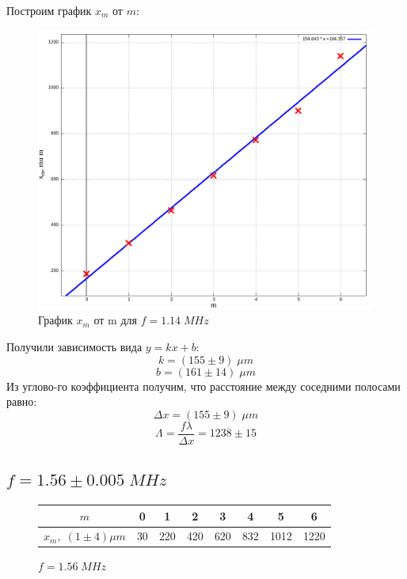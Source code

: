 \documentclass{article}
\begin{document}
Построим график \(x_m\) от \(m\):
\begin{figure}[H]
  \centering
  \includegraphics[width=\textwidth]{1140KHz.png}
  \caption{График \(x_m\) от m для \(f = 1.14\; MHz\)}
  \label{fig:1140KHz}
\end{figure}

Получили зависимость вида \(y = kx + b\):
\[ k = (155 \pm 9)\; \mu m \]
\[ b = (161 \pm 14)\; \mu m \]
Из углово-го коэффициента получим, что расстояние между соседними полосами равно:
\[ \Delta x = (155 \pm 9)\; \mu m \]
\[ \Lambda = \frac{f\lambda}{\Delta x} = 1238 \pm 15 \]

\subsection*{\(f = 1.56 \pm 0.005\; MHz\)}
\begin{figure}[H]
  \centering
  \begin{tabular}{|c|c|c|c|c|c|c|c|}
    \hline
    \(m\) & 0 & 1 & 2 & 3 & 4 & 5 & 6\\\hline
    \(x_m,\; (1 \pm 4) \mu m\) & 30 & 220 & 420 & 620 & 832 & 1012 & 1220\\\hline
  \end{tabular}
  \caption{\(f = 1.56\; MHz\)}
\end{figure}
\end{document}
